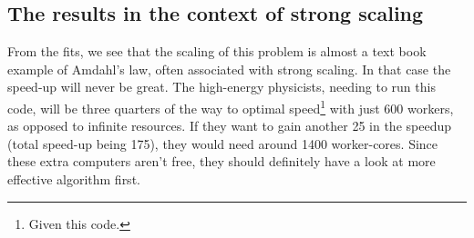 \documentclass{article}
\begin{document}
\subsection{The results in the context of strong scaling}
%
From the fits, we see that the scaling of this problem is almost a text book example of Amdahl's law, often associated with strong scaling. In that case the speed-up will never be great. The high-energy physicists, needing to run this code, will be three quarters of the way to optimal speed\footnote{Given this code.} with just 600 workers, as opposed to infinite resources. If they want to gain another 25 in the speedup (total speed-up being 175), they would need around 1400 worker-cores. Since these extra computers aren't free, they  should definitely have a look at more effective algorithm first.
\newpage
\end{document}
